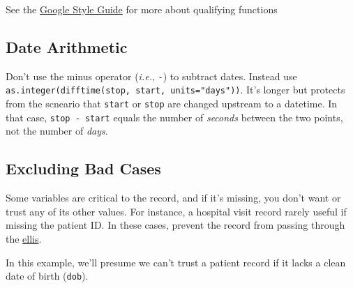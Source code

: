 \documentclass[
]{book}
\begin{document}
See the \href{https://google.github.io/styleguide/Rguide.html\#qualifying-namespaces}{Google Style Guide} for more about qualifying functions

\hypertarget{coding-defensive-date-arithmetic}{%
\subsection{Date Arithmetic}\label{coding-defensive-date-arithmetic}}

Don't use the minus operator (\emph{i.e.}, \texttt{-}) to subtract dates. Instead use \texttt{as.integer(difftime(stop,\ start,\ units="days"))}. It's longer but protects from the scneario that \texttt{start} or \texttt{stop} are changed upstream to a datetime. In that case, \texttt{stop\ -\ start} equals the number of \emph{seconds} between the two points, not the number of \emph{days}.

\hypertarget{excluding-bad-cases}{%
\subsection{Excluding Bad Cases}\label{excluding-bad-cases}}

Some variables are critical to the record, and if it's missing, you don't want or trust any of its other values. For instance, a hospital visit record rarely useful if missing the patient ID. In these cases, prevent the record from passing through the \protect\hyperlink{pattern-ellis}{ellis}.

In this example, we'll presume we can't trust a patient record if it lacks a clean date of birth (\texttt{dob}).
\end{document}
